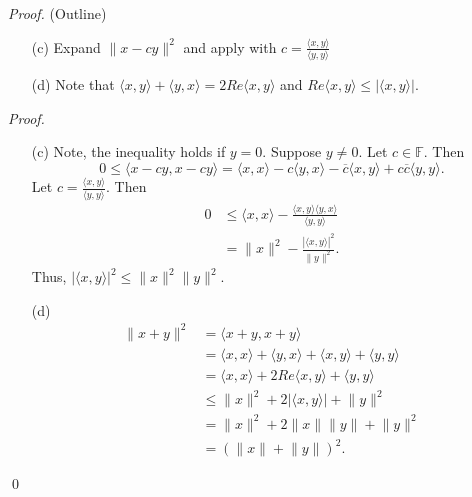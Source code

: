 \documentclass[12pt]{article}
\newenvironment{sol}
    {\emph{Proof.}
    }
    {
    \qed
    }
\begin{document}
\textit{Proof.} (Outline)

\begin{itemize}
    \item[(c)] Expand $\lVert x - cy\rVert^2$ and apply with $c = \frac{\langle x, y \rangle}{\langle y, y \rangle}$
    
    \item[(d)] Note that $\langle x, y \rangle + \langle y, x \rangle = 2Re\langle x, y \rangle$ and $Re\langle x, y \rangle \leq \lvert \langle x, y \rangle \rvert$.
\end{itemize}

\begin{sol}
\begin{itemize}
    \item[(c)] Note, the inequality holds if $y = 0$. Suppose $y \neq 0$. Let $c \in \mathbb{F}$. Then $$0 \leq \langle x-cy, x-cy \rangle = \langle x, x \rangle - c \langle y, x \rangle - \overline{c} \langle x, y \rangle + c \overline{c} \langle y, y \rangle.$$ Let $c = \frac{\langle x, y \rangle}{\langle y, y \rangle}$. Then \begin{align*}
    0 &\leq \langle x, x \rangle - \frac{\langle x, y \rangle \langle y, x \rangle}{\langle y, y \rangle} \\
    &= \lVert x \rVert^2 - \frac{\left| \langle x, y \rangle \right|^2}{\lVert y \rVert^2}.
\end{align*} Thus, $\left| \langle x, y \rangle \right|^2 \leq \lVert x \rVert^2 \lVert y \rVert^2$.

\item[(d)] \begin{align*}
    \lVert x+y \rVert^2 &= \langle x+y, x+y \rangle \\
    &= \langle x, x \rangle + \langle y, x \rangle + \langle x, y \rangle + \langle y, y \rangle \\
    &= \langle x, x \rangle + 2Re \langle x, y \rangle + \langle y, y \rangle \\
    &\leq \lVert x \rVert^2 + 2 \left| \langle x, y \rangle \right| + \lVert y \rVert^2 \\
    &= \lVert x \rVert^2 + 2 \lVert x \rVert \lVert y \rVert + \lVert y \rVert^2 \tag{By Cauchy-Schwartz} \\
    &= (\lVert x \rVert + \lVert y \rVert)^2.
\end{align*}
\end{itemize}

\end{sol}
\end{document}
